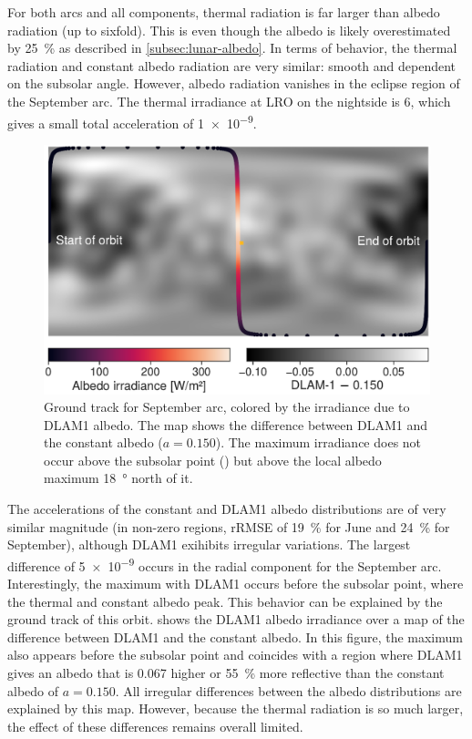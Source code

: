 For both arcs and all components, thermal radiation is far larger than albedo radiation (up to sixfold). This is even though the albedo is likely overestimated by \qty{25}{\percent} as described in \cref{subsec:lunar-albedo}. In terms of behavior, the thermal radiation and constant albedo radiation are very similar: smooth and dependent on the subsolar angle. However, albedo radiation vanishes in the eclipse region of the September arc. The thermal irradiance at \gls{LRO} on the nightside is \qty{6}{\irr}, which gives a small total acceleration of \qty{1e-9}{\acc}.


\begin{figure}[htb]
    \centering
    \includegraphics[width=\linewidth]{figures/plots/groundtrack.pdf}
    \caption{Ground track for September arc, colored by the irradiance due to \gls{DLAM1} albedo. The map shows the difference between \gls{DLAM1} and the constant albedo ($a=0.150$). The maximum irradiance does not occur above the subsolar point (\textcolor{mpl-yellow}{}) but above the local albedo maximum \qty{18}{\degree} north of it.}
    \label{fig:groundtrack}
\end{figure}

The accelerations of the constant and \gls{DLAM1} albedo distributions are of very similar magnitude (in non-zero regions, rRMSE of \qty{19}{\percent} for June and \qty{24}{\percent} for September), although \gls{DLAM1} exihibits irregular variations. The largest difference of \qty{5e-9}{\acc} occurs in the radial component for the September arc. Interestingly, the maximum with \gls{DLAM1} occurs before the subsolar point, where the thermal and constant albedo peak. This behavior can be explained by the ground track of this orbit.  shows the \gls{DLAM1} albedo irradiance over a map of the difference between \gls{DLAM1} and the constant albedo. In this figure, the maximum also appears before the subsolar point and coincides with a region where \gls{DLAM1} gives an albedo that is \num{0.067} higher or \qty{55}{\percent} more reflective than the constant albedo of $a=0.150$. All irregular differences between the albedo distributions are explained by this map. However, because the thermal radiation is so much larger, the effect of these differences remains overall limited.









